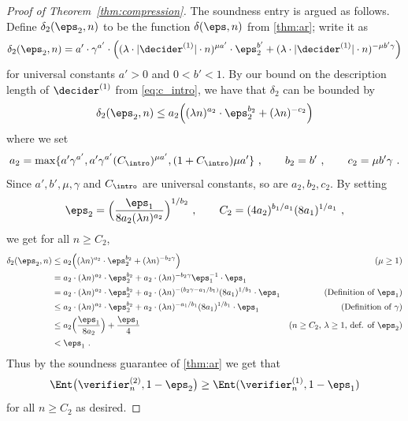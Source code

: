 \begin{proof}[Proof of Theorem~\ref{thm:compression}]
The soundness entry is argued as follows. Define $\delta_2(\eps_2,n)$ to be the function $\delta(\eps,n)$ from \cref{thm:ar}; write it as \begin{equation}\label{eq:lambda2-15}
    \delta_2(\eps_2, n) = a' \cdot \gamma^{a'} \cdot \Bigl( (\lambda \cdot |\decider^{(1)}| \cdot n)^{\mu a'} \cdot \eps_2^{b'} +
    (\lambda \cdot |\decider^{(1)}| \cdot n)^{-\mu b' \gamma} \Bigr)
  \end{equation}
	for universal constants $a' > 0$ and $0< b' < 1$. By our bound on the description length of $\decider^{(1)}$ from \cref{eq:c_intro}, we have that $\delta_2$ can be bounded by
  \begin{align*}
  	\delta_2(\eps_2, n) \leq a_2 \Bigl( (\lambda  n)^{a_2} \cdot \eps_2^{b_2} +
    (\lambda n)^{-c_2} \Bigr)
  \end{align*}
  where we set 
  \begin{equation}
  \label{eq:re-b-2} 
  	a_2 = \max \{ a' \gamma^{a'}, a' \gamma^{a'} (C_\intro)^{\mu a'}, (1+C_\intro) \mu a' \} ~, \qquad b_2 = b' ~, \qquad c_2= \mu b' \gamma~.
\end{equation}
Since $a',b',\mu,\gamma$ and $C_\intro$ are universal constants, so are $a_2,b_2,c_2$. 
    By setting
  \begin{equation}
  \label{eq:re-eps-2}
  	\eps_2 = \Bigl(\frac{\eps_1}{8a_2(\lambda n)^{a_2}}\Bigr)^{1/b_2}~, \qquad C_2 = (4a_2)^{b_1/a_1} (8a_1)^{1/a_1}~,
  \end{equation}   
  we get for all $n \geq C_2$, 
  \begin{align*}
      \delta_2(\eps_2, n) & \leq a_2 \Bigl( (\lambda n)^{a_2} \cdot \eps_2^{b_2} + (\lambda
      n)^{-b_2 \gamma} \Bigr) & \text{($\mu \geq 1$)}\\
      & = a_2 \cdot (\lambda n)^{a_2} \cdot \eps_2^{b_2} + a_2 \cdot (\lambda
      n)^{-b_2 \gamma } \eps_1^{-1} \cdot \eps_1\\
      & = a_2 \cdot (\lambda n)^{a_2} \cdot \eps_2^{b_2} + a_2 \cdot (\lambda
      n)^{-(b_2 \gamma - a_1/b_1)} (8a_1)^{1/b_1} \cdot \eps_1 & \text{(Definition of $\eps_1$)}\\
      & \leq a_2 \cdot (\lambda n)^{a_2} \cdot \eps_2^{b_2} + a_2 \cdot (\lambda
      n)^{-a_1/b_1} (8a_1)^{1/b_1} \cdot \eps_1 & \text{(Definition of $\gamma$)} \\
      & \le a_2 \Bigl( \frac{\eps_1}{8 a_2} \Bigr) + \frac{\eps_1}{4} & \text{($n \geq C_2$, $\lambda \geq 1$, def. of $\eps_2$)} \\
      & < \eps_1~.
  \end{align*}
Thus by the soundness guarantee of \cref{thm:ar} we get that
  \[
  	\Ent \big(
    \verifier_n^{(2)}, 1 - \eps_2 \big) \geq \Ent(\verifier_n^{(1)}, 1 - \eps_1)
  \]
  for all $n \geq C_2$ as desired.  
  	




\end{proof}
